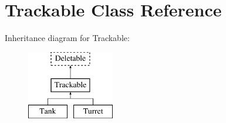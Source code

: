 \hypertarget{class_trackable}{\section{Trackable Class Reference}
\label{class_trackable}
}
Inheritance diagram for Trackable\+:\begin{figure}[H]
\begin{center}
\leavevmode
\includegraphics[height=3.000000cm]{class_trackable}
\end{center}
\end{figure}
